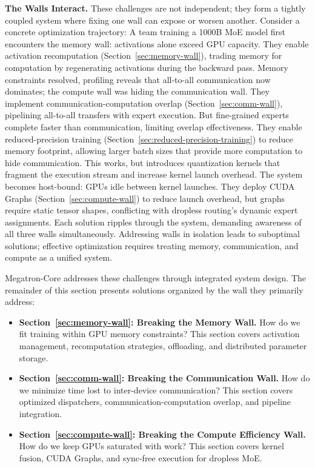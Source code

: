 \documentclass[10pt,logo,copyright]{nvidiatechreport}
\begin{document}
\textbf{The Walls Interact.} These challenges are not independent; they form a tightly coupled system where fixing one wall can expose or worsen another. Consider a concrete optimization trajectory: A team training a 1000B MoE model first encounters the memory wall: activations alone exceed GPU capacity. They enable activation recomputation (Section~\ref{sec:memory-wall}), trading memory for computation by regenerating activations during the backward pass. Memory constraints resolved, profiling reveals that all-to-all communication now dominates; the compute wall was hiding the communication wall. They implement communication-computation overlap (Section~\ref{sec:comm-wall}), pipelining all-to-all transfers with expert execution. But fine-grained experts complete faster than communication, limiting overlap effectiveness. They enable reduced-precision training (Section~\ref{sec:reduced-precision-training}) to reduce memory footprint, allowing larger batch sizes that provide more computation to hide communication. This works, but introduces quantization kernels that fragment the execution stream and increase kernel launch overhead. The system becomes host-bound: GPUs idle between kernel launches. They deploy CUDA Graphs (Section~\ref{sec:compute-wall}) to reduce launch overhead, but graphs require static tensor shapes, conflicting with dropless routing's dynamic expert assignments. Each solution ripples through the system, demanding awareness of all three walls simultaneously. Addressing walls in isolation leads to suboptimal solutions; effective optimization requires treating memory, communication, and compute as a unified system.

Megatron-Core addresses these challenges through integrated system design. The remainder of this section presents solutions organized by the wall they primarily address:
\begin{itemize}
    \item \textbf{Section~\ref{sec:memory-wall}: Breaking the Memory Wall.} How do we fit training within GPU memory constraints? This section covers activation management, recomputation strategies, offloading, and distributed parameter storage.
    \item \textbf{Section~\ref{sec:comm-wall}: Breaking the Communication Wall.} How do we minimize time lost to inter-device communication? This section covers optimized dispatchers, communication-computation overlap, and pipeline integration.
    \item \textbf{Section~\ref{sec:compute-wall}: Breaking the Compute Efficiency Wall.} How do we keep GPUs saturated with work? This section covers kernel fusion, CUDA Graphs, and sync-free execution for dropless MoE.
\end{itemize}
\end{document}
